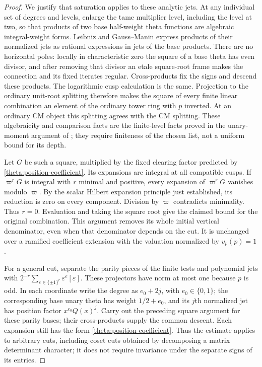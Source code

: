 \begin{proof}
We justify that saturation applies to these analytic jets.  At any
individual set of degrees and levels, enlarge the tame multiplier
level, including the level at two, so that products of two base
half-weight theta functions are algebraic integral-weight forms.
Leibniz and Gauss--Manin express products of their normalized jets
as rational expressions in jets of the base products.  There are
no horizontal poles: locally in characteristic zero the square of
a base theta has even divisor, and after removing that divisor an
etale square-root frame makes the connection and its fixed iterates
regular.  Cross-products fix the signs and descend these products.
The logarithmic cusp calculation is the same.  Projection to the
ordinary unit-root splitting therefore makes the square of every
finite linear combination an element of the ordinary tower ring
with $p$ inverted.  At an ordinary CM object this splitting agrees
with the CM splitting.  These algebraicity and comparison facts are
the finite-level facts proved in the unary-moment argument of
\cite[Lemma 4.4]{C}; they require
finiteness of the chosen list, not a uniform bound for its depth.

Let $G$ be such a square, multiplied by the fixed clearing factor
predicted by \eqref{theta:position-coefficient}.  Its expansions
are integral at all compatible cusps.  If $\varpi^rG$ is integral
with $r$ minimal and positive, every expansion of $\varpi^rG$
vanishes modulo $\varpi$.  By the scalar Hilbert expansion
principle just established, its reduction is zero on every
component.  Division by $\varpi$
contradicts minimality.  Thus $r=0$.  Evaluation and taking the
square root give the claimed bound for the original combination.
This argument removes its whole initial vertical denominator, even
when that denominator depends on the cut.  It is unchanged over a
ramified coefficient extension with the valuation normalized by
$v_p(p)=1$.

For a general cut, separate the parity pieces of the finite
tests and polynomial jets with
$2^{-r}\sum_{\varepsilon\in\{\pm1\}^r}
\varepsilon^e[\varepsilon]$.  These projectors have norm at most
one because $p$ is odd.  In each coordinate write the degree as
$e_0+2j$, with $e_0\in\{0,1\}$; the corresponding base unary
theta has weight $1/2+e_0$, and its $j$th normalized jet has
position factor $x^{e_0}Q(x)^j$.  Carry out the preceding square
argument for these parity bases; their cross-products supply
the common descent.  Each expansion still has the form
\eqref{theta:position-coefficient}.  Thus the estimate applies to
arbitrary cuts, including coset cuts obtained by decomposing a
matrix determinant character; it does not require invariance under
the separate signs of its entries.


\end{proof}
